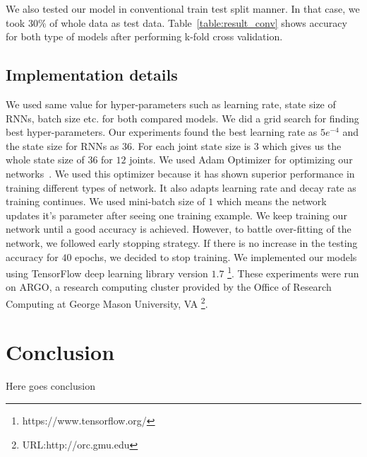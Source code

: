 \documentclass[10pt,twocolumn,letterpaper]{article}
\begin{document}
We also tested our model in conventional train test split manner. In that case, we took $30\%$ of whole data as test data. Table~\ref{table:result_conv} shows accuracy for both type of models after performing k-fold cross validation.

 
\subsection{Implementation details}
We used same value for hyper-parameters such as learning rate, state size of RNNs, batch size etc. for both compared models. We did a grid search for finding best hyper-parameters. Our experiments found the best learning rate as $5e^{-4}$ and the state size for RNNs as $36$. For each joint state size is $3$ which gives us the whole state size of $36$ for $12$ joints. We used Adam Optimizer for optimizing our networks~\cite{DBLP:journals/corr/KingmaB14}. We used this optimizer because it has shown superior performance in training different types of network. It also adapts learning rate and decay rate as training continues. We used mini-batch size of $1$ which means the network updates it's parameter after seeing one training example. We keep training our network until a good accuracy is achieved. However, to battle over-fitting of the network, we followed early stopping strategy. If there is no increase in the testing accuracy for $40$ epochs, we decided to stop training. We implemented our models using TensorFlow deep learning library version $1.7$ \footnote{https://www.tensorflow.org/}. These experiments were run on ARGO, a research computing cluster provided by the Office of Research Computing at George Mason University, VA \footnote{URL:http://orc.gmu.edu}. 

\section{Conclusion}
Here goes conclusion




{\small


}
\end{document}
